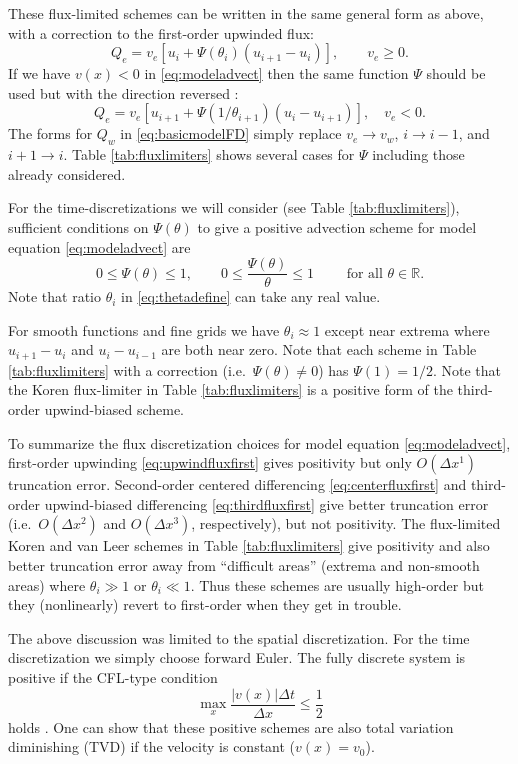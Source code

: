 \documentclass[gmd]{copernicus}   %
\newcommand{\text}{\textrm}
\newcommand\RR{\mathbb{R}}
\begin{document}
These flux-limited schemes can be written in the same general form as above, with a correction to the first-order upwinded flux:
\begin{equation}
Q_e = v_e \left[u_i + \Psi(\theta_i) (u_{i+1} - u_i)\right], \qquad v_e \ge 0. \label{eq:fluxlimiterform}
\end{equation}
If we have $v(x)<0$ in \eqref{eq:modeladvect} then the same function $\Psi$ should be used but with the direction reversed \citep[section III.1.1]{HundsdorferVerwer2010}:
\begin{equation}
Q_e = v_e \left[u_{i+1} + \Psi\left(1/\theta_{i+1}\right) (u_i - u_{i+1})\right], \quad v_e < 0. \label{eq:fluxlimiterformreversed}
\end{equation}
The forms for $Q_w$ in \eqref{eq:basicmodelFD} simply replace $v_e \to v_w$, $i\to i-1$, and $i+1\to i$.  Table \ref{tab:fluxlimiters} shows several cases for $\Psi$ including those already considered.

For the time-discretizations we will consider (see Table \ref{tab:fluxlimiters}), sufficient conditions on $\Psi(\theta)$ to give a positive advection scheme for model equation \eqref{eq:modeladvect} are
\begin{equation}
0 \le \Psi(\theta) \le 1, \qquad 0 \le \frac{\Psi(\theta)}{\theta} \le 1 \qquad \text{ for all } \theta \in \RR.
\end{equation}
Note that ratio $\theta_i$ in \eqref{eq:thetadefine} can take any real value.

For smooth functions and fine grids we have $\theta_i\approx 1$ except near extrema where $u_{i+1} - u_i$ and $u_i - u_{i-1}$ are both near zero.  Note that each scheme in Table \ref{tab:fluxlimiters} with a correction (i.e.~$\Psi(\theta)\ne 0$) has $\Psi(1)=1/2$.  Note that the Koren flux-limiter in Table \ref{tab:fluxlimiters} is a positive form of the third-order upwind-biased scheme.

To summarize the flux discretization choices for model equation \eqref{eq:modeladvect}, first-order upwinding \eqref{eq:upwindfluxfirst} gives positivity but only $O(\Delta x^1)$ truncation error.  Second-order centered differencing \eqref{eq:centerfluxfirst} and third-order upwind-biased differencing \eqref{eq:thirdfluxfirst} give better truncation error (i.e.~$O(\Delta x^2)$ and $O(\Delta x^3)$, respectively), but not positivity.  The flux-limited Koren and van Leer schemes in Table \ref{tab:fluxlimiters} give positivity and also better truncation error away from ``difficult areas'' (extrema and non-smooth areas) where $\theta_i\gg 1$ or $\theta_i\ll 1$.  Thus these schemes are usually high-order but they (nonlinearly) revert to first-order when they get in trouble.

The above discussion was limited to the spatial discretization.  For the time discretization we simply choose forward Euler.  The fully discrete system is positive if the CFL-type condition
\begin{equation}
\max_x \frac{|v(x)|\Delta t}{\Delta x} \le \frac{1}{2} \label{eq:CFL}
\end{equation}
holds \citep[section III.1.1]{HundsdorferVerwer2010}.  One can show that these positive schemes are also total variation diminishing (TVD) if the velocity is constant ($v(x)=v_0$).
\end{document}
